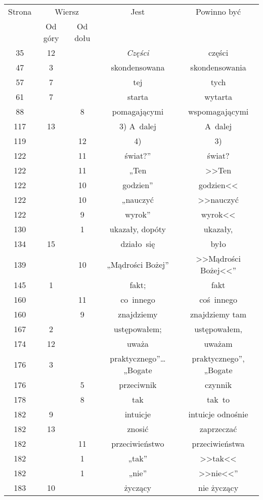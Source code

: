 \documentclass[a4paper,11pt]{article}
\numberwithin{equation}{section}
\begin{document}
\begin{center}

  \begin{tabular}{|c|c|c|c|c|}
    \hline
    Strona & \multicolumn{2}{c|}{Wiersz} & Jest
                              & Powinno być \\ \cline{2-3}
    & Od góry & Od dołu & & \\
    \hline
    \hphantom{0}35 & 12 & & \textit{Części} & części \\
    \hphantom{0}47 & \hphantom{0}3 & & skondensowana & skondensowania \\
    \hphantom{0}57 & \hphantom{0}7 & & tej & tych \\
    \hphantom{0}61 & \hphantom{0}7 & & starta & wytarta \\
    \hphantom{0}88 & & \hphantom{0}8 & pomagającymi & wspomagającymi \\
    117 & 13 & & 3) A~dalej & A~dalej \\
    119 & & 12 & 4) & 3) \\
    122 & & 11 & świat?” & świat? \\
    122 & & 11 & „Ten & >>Ten \\
    122 & & 10 & godzien” & godzien<<  %
    \\
    122 & & 10 & „nauczyć & >>nauczyć \\
    122 & & \hphantom{0}9 & wyrok” & wyrok<<  %
    \\
    130 & & \hphantom{0}1 & ukazały, dopóty & ukazały, \\
    134 & 15 & & działo~się & było \\
    139 & & 10 & „Mądrości Bożej” & >>Mądrości Bożej<<”  %
    \\
    145 & \hphantom{0}1 & & fakt; & fakt \\
    160 & & 11 & co~innego & coś~innego \\
    160 & & \hphantom{0}9 & znajdziemy & znajdziemy tam \\
    167 & \hphantom{0}2 & & ustępowałem; & ustępowałem, \\
    174 & 12 & & uważa & uważam \\
    176 & \hphantom{0}3 & & praktycznego”\ldots „Bogate
    & praktycznego”, „Bogate \\
    176 & & \hphantom{0}5 & przeciwnik & czynnik \\
    178 & & \hphantom{0}8 & tak & tak~to \\
    182 & \hphantom{0}9 & & intuicje & intuicje odnośnie \\
    182 & 13 & & znosić & zaprzeczać \\
    182 & & 11 & przeciwieństwo & przeciwieństwa \\
    182 & & \hphantom{0}1 & „tak” & >>tak<<  %
    \\
    182 & & \hphantom{0}1 & „nie” & >>nie<<”  %
    \\
    183 & 10 & & życzący & nie życzący \\
    \hline
  \end{tabular}






\end{center}
\end{document}
